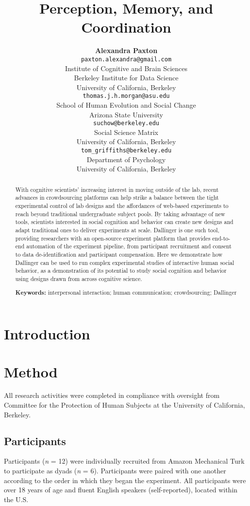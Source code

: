 \documentclass[10pt, letterpaper]{article}
\title{Perception, Memory, and Coordination}
\author{{\large \bf Alexandra Paxton} \\ \texttt{paxton.alexandra@gmail.com} \\ Institute of Cognitive and Brain Sciences \\ Berkeley Institute for Data Science \\ University of California, Berkeley \And {\large \bf Thomas J. H. Morgan} \\ \texttt{thomas.j.h.morgan@asu.edu} \\ School of Human Evolution and Social Change \\ Arizona State University \AND {\large \bf Jordan W. Suchow} \\ \texttt{suchow@berkeley.edu} \\ Social Science Matrix \\ University of California, Berkeley \And {\large \bf Thomas L. Griffiths} \\ \texttt{tom\_griffiths@berkeley.edu} \\ Department of Psychology \\ University of California, Berkeley}
\begin{document}
\maketitle

\begin{abstract}
With cognitive scientists' increasing interest in moving outside of the
lab, recent advances in crowdsourcing platforms can help strike a
balance between the tight experimental control of lab designs and the
affordances of web-based experiments to reach beyond traditional
undergraduate subject pools. By taking advantage of new tools,
scientists interested in social cognition and behavior can create new
designs and adapt traditional ones to deliver experiments at scale.
Dallinger is one such tool, providing researchers with an open-source
experiment platform that provides end-to-end automation of the
experiment pipeline, from participant recruitment and consent to data
de-identification and participant compensation. Here we demonstrate how
Dallinger can be used to run complex experimental studies of interactive
human social behavior, as a demonstration of its potential to study
social cognition and behavior using designs drawn from across cognitive
science.

\textbf{Keywords:}
interpersonal interaction; human communication; crowdsourcing; Dallinger
\end{abstract}

\section{Introduction}\label{introduction}

\section{Method}\label{method}

All research activities were completed in compliance with oversight from
Committee for the Protection of Human Subjects at the University of
California, Berkeley.

\subsection{Participants}\label{participants}

Participants (\emph{n} = 12) were individually recruited from Amazon
Mechanical Turk to participate as dyads (\emph{n} = 6). Participants
were paired with one another according to the order in which they began
the experiment. All participants were over 18 years of age and fluent
English speakers (self-reported), located within the U.S.
\end{document}
